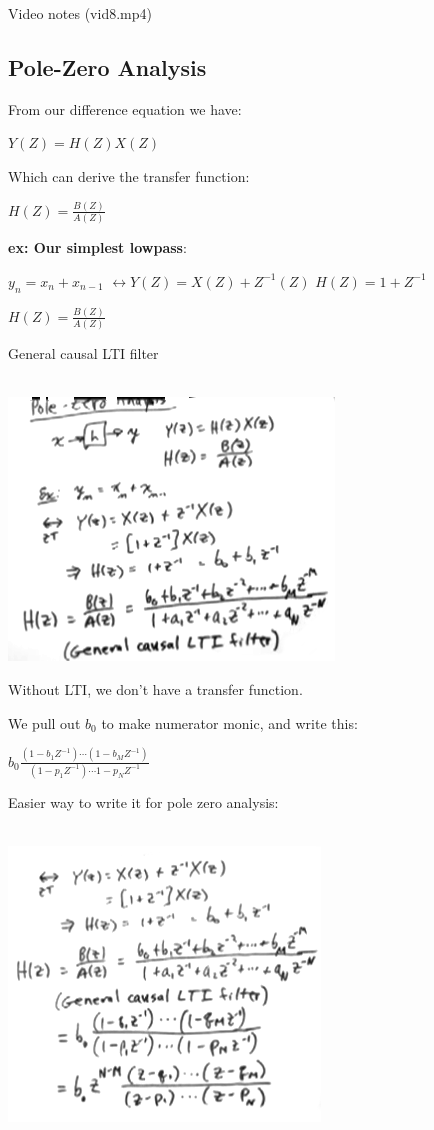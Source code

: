 Video notes (vid8.mp4)
\subsection*{Pole-Zero Analysis}

From our difference equation we have:

$Y(Z) = H(Z)X(Z)$

Which can derive the transfer function:

$H(Z) = \frac{B(Z)}{A(Z)}$

\textbf{ex: Our simplest lowpass}:

$y_n= x_n + x_{n - 1}$
$\leftrightarrow Y(Z) = X(Z) + Z^{-1}(Z)$
$H(Z) = 1 + Z^{-1}$


$H(Z) = \frac{B(Z)}{A(Z)}$

General causal LTI filter

\\
\includegraphics[scale=0.8]{frames/12a}

Without LTI, we don't have a transfer function. 

We pull out $b_0$ to make numerator monic, and write this:

$b_0 \frac{(1 - b_1 Z^{-1})\cdots(1 - b_M Z^{-1})}
{(1 - p_1Z^{-1})\cdots{1 - p_N Z^{-1}}}$


Easier way to write it for pole zero analysis:

\\
\includegraphics[scale=0.8]{frames/12b}


